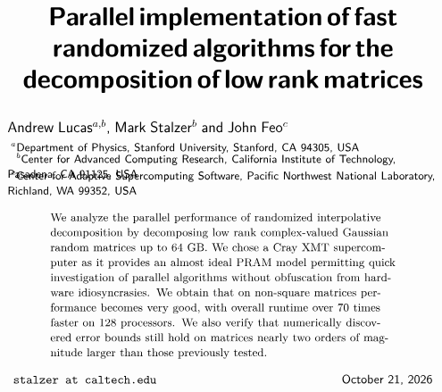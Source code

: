 \documentclass[11pt]{article}
\newcommand{\stylecolor}{black}
\newcommand{\titletext}{Parallel implementation of fast randomized algorithms for the decomposition of low rank matrices}
\begin{document}
\pagestyle{fancy}
\renewcommand{\headrulewidth}{0pt}
\fancyhead{}

\fancyfoot{}
\fancyfoot[C] {\textsf{\textbf{\thepage}}}





\begin{equation*}
\begin{tikzpicture}
\draw (0.5\textwidth, -3) node[text width = \textwidth] {{\huge \begin{center} \color{\stylecolor} \textsf{\textbf{\titletext}} \end{center}}}; 
\end{tikzpicture}
\end{equation*}
\begin{equation*}
\begin{tikzpicture}
\draw (0.5\textwidth, 0.1) node[text width=\textwidth] {\large \color{black} \textsf{Andrew Lucas$^{a,b}$, Mark Stalzer$^b$ and John Feo$^c$}};
\draw (0.5\textwidth, -0.5) node[text width=\textwidth] {\small $\;^a$\textsf{Department of Physics, Stanford University, Stanford, CA 94305, USA}};
\draw (0.5\textwidth, -1) node[text width=\textwidth] {\small $\;^b$\textsf{Center for Advanced Computing Research, California Institute of Technology, Pasadena, CA 91125, USA}};
\draw (0.5\textwidth, -1.5) node[text width=\textwidth] {\small $\;^c$\textsf{Center for Adaptive Supercomputing Software, Pacific Northwest National Laboratory, Richland, WA 99352, USA}};
\end{tikzpicture}
\end{equation*}
\begin{equation*}
\begin{tikzpicture}
\draw (0.5\textwidth, -6) node[below, text width=0.8\textwidth] {\small  We analyze the parallel performance of randomized interpolative decomposition by decomposing low rank complex-valued Gaussian random matrices up to 64 GB.  We chose a Cray XMT supercomputer as it provides an almost ideal PRAM model permitting quick investigation of parallel algorithms without obfuscation from hardware idiosyncrasies. We obtain that on non-square matrices performance becomes very good, with overall runtime over 70 times faster on 128 processors.  We also verify that numerically discovered error bounds still hold on matrices nearly two orders of magnitude larger than those previously tested. };  
\end{tikzpicture}
\end{equation*}
\begin{equation*}
\begin{tikzpicture}
\draw (0, -13.1) node[right] {\texttt{stalzer at caltech.edu}};
\draw (\textwidth, -13.1) node[left] {\textsf{\today}};
\end{tikzpicture}
\end{equation*}
\end{document}

